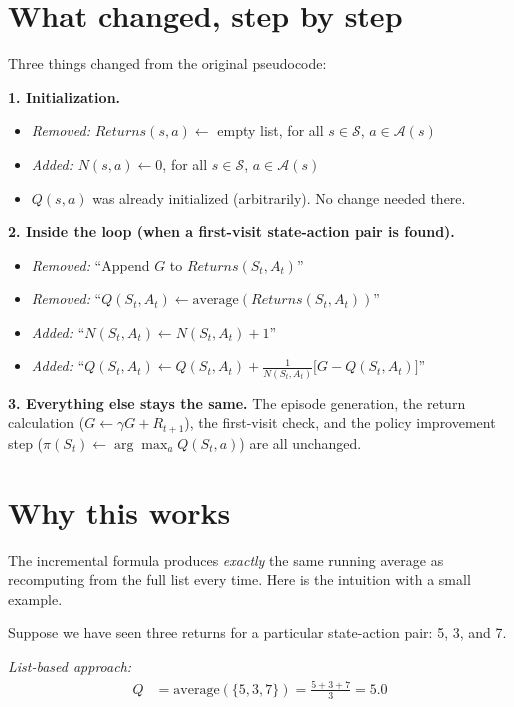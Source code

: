 \documentclass[11pt]{article}
\begin{document}
\section*{What changed, step by step}

Three things changed from the original pseudocode:

\textbf{1. Initialization.}
\begin{itemize}[nosep]
    \item \textit{Removed:} $Returns(s, a) \leftarrow$ empty list, for all $s \in \mathcal{S}$, $a \in \mathcal{A}(s)$
    \item \textit{Added:} $N(s, a) \leftarrow 0$, for all $s \in \mathcal{S}$, $a \in \mathcal{A}(s)$
    \item $Q(s, a)$ was already initialized (arbitrarily). No change needed there.
\end{itemize}

\textbf{2. Inside the loop (when a first-visit state-action pair is found).}
\begin{itemize}[nosep]
    \item \textit{Removed:} ``Append $G$ to $Returns(S_t, A_t)$''
    \item \textit{Removed:} ``$Q(S_t, A_t) \leftarrow \text{average}(Returns(S_t, A_t))$''
    \item \textit{Added:} ``$N(S_t, A_t) \leftarrow N(S_t, A_t) + 1$''
    \item \textit{Added:} ``$Q(S_t, A_t) \leftarrow Q(S_t, A_t) + \frac{1}{N(S_t, A_t)}\big[G - Q(S_t, A_t)\big]$''
\end{itemize}

\textbf{3. Everything else stays the same.} The episode generation, the return calculation ($G \leftarrow \gamma G + R_{t+1}$), the first-visit check, and the policy improvement step ($\pi(S_t) \leftarrow \arg\max_a Q(S_t, a)$) are all unchanged.

\section*{Why this works}

The incremental formula produces \textit{exactly} the same running average as recomputing from the full list every time. Here is the intuition with a small example.

Suppose we have seen three returns for a particular state-action pair: 5, 3, and 7.

\textit{List-based approach:}
\begin{align}
    Q &= \text{average}(\{5, 3, 7\}) = \frac{5 + 3 + 7}{3} = 5.0
\end{align}
\end{document}
